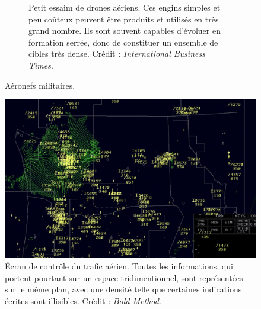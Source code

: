 \begin{appendices}
\begin{figure}[htbp]
\begin{subfigure}[t]{\subImgAircraftW}
			\caption[Petit essaim de drones aériens]{Petit essaim de drones aériens. Ces engins simples et peu coûteux peuvent être produits et utilisés en très grand nombre. Ils sont souvent capables d'évoluer en formation serrée, donc de constituer un ensemble de cibles très dense. Crédit : \emph{International Business Times}.}
			\label{fig:swarm}
		\end{subfigure}
		\caption{Aéronefs militaires.}
		\label{fig:coolAircraft}
	\end{figure}

	\begin{figure}[!htbp]
		\centering
		\includegraphics[width=\textwidth]{figures/ch1/Radar-Scope-ZSE}
		\caption[Écran de contrôle du trafic aérien, en 2D]{Écran de contrôle du trafic aérien. Toutes les informations, qui portent pourtant sur un espace tridimentionnel, sont représentées sur le même plan, avec une densité telle que certaines indications écrites sont illisibles. Crédit : \emph{Bold Method}.}
		\label{fig:airtraffic}
	\end{figure}
	

\end{appendices}
